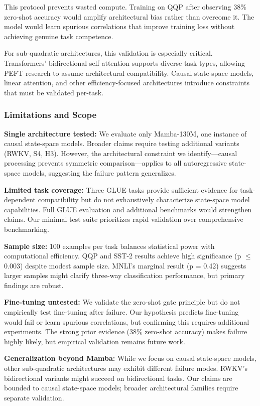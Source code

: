 This protocol prevents wasted compute. Training on QQP after observing 38\% zero-shot accuracy would amplify architectural bias rather than overcome it. The model would learn spurious correlations that improve training loss without achieving genuine task competence.

For sub-quadratic architectures, this validation is especially critical. Transformers' bidirectional self-attention supports diverse task types, allowing PEFT research to assume architectural compatibility. Causal state-space models, linear attention, and other efficiency-focused architectures introduce constraints that must be validated per-task.

\subsubsection{Limitations and Scope}

\textbf{Single architecture tested:} We evaluate only Mamba-130M, one instance of causal state-space models. Broader claims require testing additional variants (RWKV, S4, H3). However, the architectural constraint we identify---causal processing prevents symmetric comparison---applies to all autoregressive state-space models, suggesting the failure pattern generalizes.

\textbf{Limited task coverage:} Three GLUE tasks provide sufficient evidence for task-dependent compatibility but do not exhaustively characterize state-space model capabilities. Full GLUE evaluation and additional benchmarks would strengthen claims. Our minimal test suite prioritizes rapid validation over comprehensive benchmarking.

\textbf{Sample size:} 100 examples per task balances statistical power with computational efficiency. QQP and SST-2 results achieve high significance (p $\leq$ 0.003) despite modest sample size. MNLI's marginal result (p = 0.42) suggests larger samples might clarify three-way classification performance, but primary findings are robust.

\textbf{Fine-tuning untested:} We validate the zero-shot gate principle but do not empirically test fine-tuning after failure. Our hypothesis predicts fine-tuning would fail or learn spurious correlations, but confirming this requires additional experiments. The strong prior evidence (38\% zero-shot accuracy) makes failure highly likely, but empirical validation remains future work.

\textbf{Generalization beyond Mamba:} While we focus on causal state-space models, other sub-quadratic architectures may exhibit different failure modes. RWKV's bidirectional variants might succeed on bidirectional tasks. Our claims are bounded to causal state-space models; broader architectural families require separate validation.

